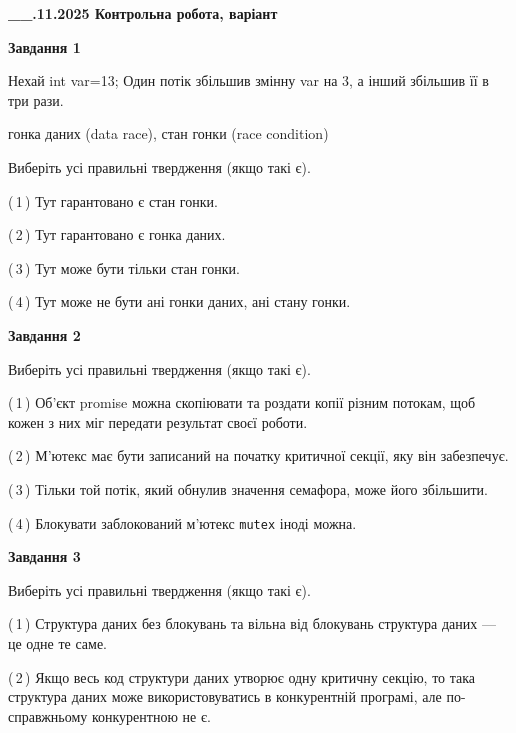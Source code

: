 \documentclass[12pt, ukrainian]{article}
\def\code#1{\Verb!#1!}
\begin{document}
\begin {large}

\textbf{\_\_.11.2025 Контрольна робота, варіант  }\par


{

\begin{center}
\textbf{Завдання 1}
\end{center}
Нехай int var=13; Один потік збільшив змінну var на 3, а інший збільшив її в три рази.

гонка даних (data race), стан гонки (race condition)

Виберіть усі правильні твердження (якщо такі є).\par
\vspace{2mm}
(\,1\,) Тут гарантовано є стан гонки.%

(\,2\,) Тут гарантовано є гонка даних.%

(\,3\,) Тут може бути тільки стан гонки.%

(\,4\,) Тут може не бути ані гонки даних, ані стану гонки.%



\begin{center}
\textbf{Завдання 2}
\end{center}
Виберіть усі правильні твердження (якщо такі є).\par
\vspace{2mm}

(\,1\,) Об’єкт promise можна скопіювати та роздати копії різним потокам, щоб кожен з них міг передати результат своєї роботи.%

(\,2\,) М’ютекс має бути записаний на початку критичної секції, яку він забезпечує.%

(\,3\,) Тільки той потік, який обнулив значення семафора, може його збільшити.%

(\,4\,) Блокувати заблокований м’ютекс  \code{mutex} іноді можна.%



\begin{center}
\textbf{Завдання 3}
\end{center}
Виберіть усі правильні твердження (якщо такі є).\par
\vspace{2mm}

(\,1\,) Структура даних без блокувань та вільна від блокувань структура даних --- це одне те саме.%

(\,2\,) Якщо весь код структури даних утворює одну критичну секцію, то така структура даних може використовуватись в конкурентній програмі, але по-справжньо\-му конкурентною не є.%

}
\end{large}
\end{document}
